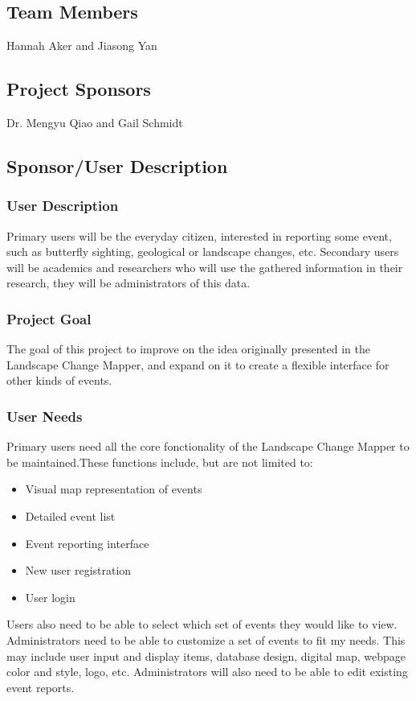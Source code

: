 
\subsection{Team Members}
Hannah Aker and Jiasong Yan
\subsection{Project Sponsors}
Dr. Mengyu Qiao and Gail Schmidt
\subsection{Sponsor/User Description}
\subsubsection{User Description}
Primary users will be the everyday citizen, interested in reporting some event, such as butterfly sighting, geological or landscape changes, etc. Secondary users will be academics and researchers who will use the gathered information in their research, they will be administrators of this data.
\subsubsection{Project Goal}
The goal of this project to improve on the idea originally presented in the Landscape Change Mapper, and expand on it to create a flexible interface for other kinds of events.
\subsubsection{User Needs}
Primary users need all the core fonctionality of the Landscape Change Mapper to be maintained.These functions include, but are not limited to:
\begin{itemize}
\item Visual map representation of events
\item Detailed event list
\item Event reporting interface
\item New user registration
\item User login
\end{itemize}
Users also need to be able to select which set of events they would like to view.
Administrators need to be able to customize a set of events to fit my needs. This may include user input and display items, database design, digital map, webpage color and style, logo, etc. Administrators will also need to be able to edit existing event reports.
